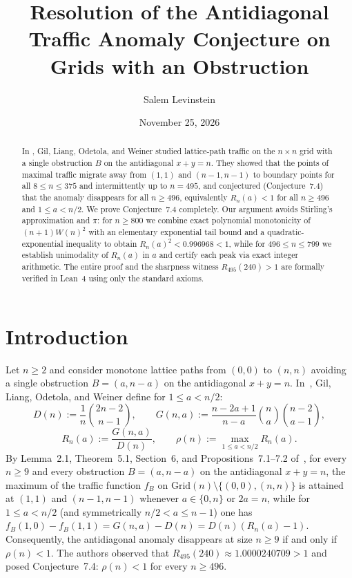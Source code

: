 \documentclass[11pt]{article}
\title{Resolution of the Antidiagonal Traffic Anomaly Conjecture on Grids with an Obstruction}
\author{Salem Levinstein}
\date{November 25, 2026}
\begin{document}
\maketitle

\begin{abstract}
In \cite{gil2026traffic}, Gil, Liang, Odetola, and Weiner studied lattice-path traffic on the $n \times n$ grid with a single obstruction $B$ on the antidiagonal $x+y=n$. They showed that the points of maximal traffic migrate away from $(1,1)$ and $(n-1,n-1)$ to boundary points for all $8 \le n \le 375$ and intermittently up to $n = 495$, and conjectured (Conjecture~7.4) that the anomaly disappears for all $n \ge 496$, equivalently $R_n(a) < 1$ for all $n \ge 496$ and $1 \le a < n/2$. We prove Conjecture~7.4 completely. Our argument avoids Stirling's approximation and $\pi$: for $n \ge 800$ we combine exact polynomial monotonicity of $(n+1)W(n)^2$ with an elementary exponential tail bound and a quadratic-exponential inequality to obtain $R_n(a)^2 < 0.996968 < 1$, while for $496 \le n \le 799$ we establish unimodality of $R_n(a)$ in $a$ and certify each peak via exact integer arithmetic. The entire proof and the sharpness witness $R_{495}(240) > 1$ are formally verified in Lean~4 using only the standard axioms.
\end{abstract}

\section{Introduction}
Let $n \ge 2$ and consider monotone lattice paths from $(0,0)$ to $(n,n)$ avoiding a single obstruction $B = (a, n-a)$ on the antidiagonal $x+y=n$. In~\cite{gil2026traffic}, Gil, Liang, Odetola, and Weiner define for $1 \le a < n/2$:
\[
D(n) := \frac{1}{n}\binom{2n-2}{n-1}, \qquad G(n,a) := \frac{n-2a+1}{n-a}\binom{n}{a}\binom{n-2}{a-1},
\]
\[
R_n(a) := \frac{G(n,a)}{D(n)}, \qquad \rho(n) := \max_{1 \le a < n/2} R_n(a).
\]
By Lemma~2.1, Theorem~5.1, Section~6, and Propositions~7.1--7.2 of~\cite{gil2026traffic}, for every $n \ge 9$ and every obstruction $B = (a, n-a)$ on the antidiagonal $x+y=n$, the maximum of the traffic function $f_B$ on $\mathrm{Grid}(n) \setminus \{(0,0),(n,n)\}$ is attained at $(1,1)$ and $(n-1,n-1)$ whenever $a \in \{0, n\}$ or $2a = n$, while for $1 \le a < n/2$ (and symmetrically $n/2 < a \le n-1$) one has $f_B(1,0) - f_B(1,1) = G(n,a) - D(n) = D(n)(R_n(a) - 1)$. Consequently, the antidiagonal anomaly disappears at size $n \ge 9$ if and only if $\rho(n) < 1$. The authors observed that $R_{495}(240) \approx 1.0000240709 > 1$ and posed Conjecture~7.4: $\rho(n) < 1$ for every $n \ge 496$.
\end{document}
